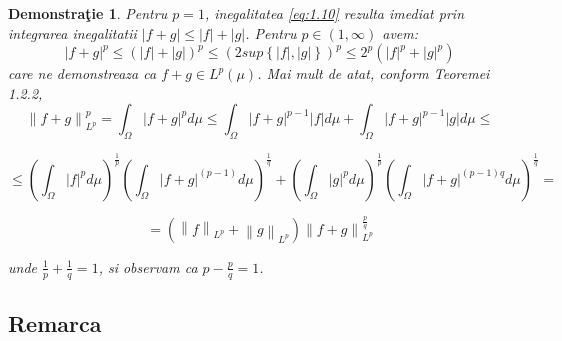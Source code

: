 \documentclass[a4paper,12pt,oneside]{report}
\newtheorem{demonstration}{Demonstra\c tie}
\begin{document}
\begin{demonstration}
Pentru \(p  = 1\), inegalitatea \ref{eq:1.10} rezulta imediat prin integrarea inegalitatii \(\left | f + g \right |\leq \left | f \right | + \left | g \right |\). Pentru \(p \in \left ( 1 , \infty  \right )\) avem:
\begin{displaymath}
  \left | f + g  \right |^{p}\leq \left ( \left | f \right | +\left | g \right |\right )^{p}\leq \left ( 2 sup\left \{ \left | f \right |,\left | g \right | \right \} \right )^{p}\leq 2^{p}\left ( \left | f \right |^{p}  + \left | g \right |^{p}\right )
\end{displaymath}
care ne demonstreaza ca \(f + g \in L^{p}\left ( \mu  \right )\). Mai mult de atat, conform Teoremei 1.2.2, 
\begin{displaymath}
  \left \| f + g  \right \|_{L^{p}}^{p} = \int_{\Omega }\left | f + g \right |^{p}d\mu \leq \int_{\Omega }\left | f + g \right |^{p - 1}\left | f \right |d\mu + \int_{\Omega }\left | f + g  \right |^{p - 1}\left | g \right |d\mu \leq 
\end{displaymath}

\begin{displaymath}
  \leq\left ( \int_{\Omega }\left | f \right |^{p}d\mu  \right )^{\frac{1}{p}}\left ( \int_{\Omega }\left | f + g  \right | ^{\left ( p - 1 \right )}d\mu \right )^{\frac{1}{q}}+ \left ( \int_{\Omega }\left | g \right |^{p}d\mu  \right )^{\frac{1}{p}}\left ( \int_{\Omega} \left | f + g \right |^{\left ( p - 1 \right )q}d\mu \right )^{\frac{1}{q}}= 
\end{displaymath}

\begin{displaymath}
  =\left ( \left \| f \right \|_{L^{p}} + \left \| g \right \|_{L^{p}} \right )\left \| f + g  \right \|_{L^{p}}^{\frac{p}{q}}
\end{displaymath}



unde \(\frac{1}{p} + \frac{1}{q} = 1\), si observam ca \(p - \frac{p}{q} = 1\). 	
\end{demonstration}


\subsection{Remarca}
\end{document}
